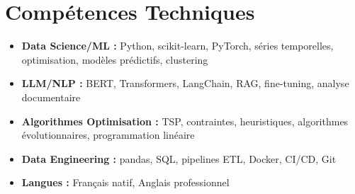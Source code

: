 \documentclass[a4paper,11pt]{article}
\begin{document}
\section{Comp\'etences Techniques}
\begin{itemize}[leftmargin=*, nosep]
    \item \small{\textbf{Data Science/ML :} Python, scikit-learn, PyTorch, s\'eries temporelles, optimisation, mod\`eles pr\'edictifs, clustering}
    \item \small{\textbf{LLM/NLP :} BERT, Transformers, LangChain, RAG, fine-tuning, analyse documentaire}
    \item \small{\textbf{Algorithmes Optimisation :} TSP, contraintes, heuristiques, algorithmes \'evolutionnaires, programmation lin\'eaire}
    \item \small{\textbf{Data Engineering :} pandas, SQL, pipelines ETL, Docker, CI/CD, Git}
    \item \small{\textbf{Langues :} Fran\c cais natif, Anglais professionnel}
\end{itemize}
\end{document}
